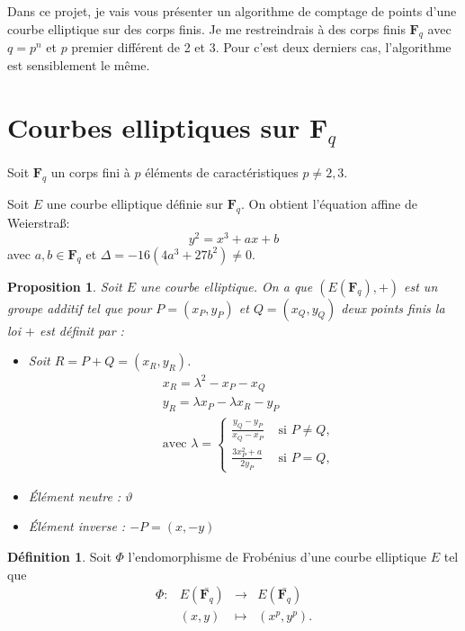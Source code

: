 \documentclass{article}%
\theoremstyle{plain}
\theoremstyle{definition}
\newtheorem{definition}{Définition}[section]
\theoremstyle{plain}
\newtheorem{proposition}{Proposition}[section]
\theoremstyle{plain}
\theoremstyle{remark}
\newcommand\fq{\mathbf{F}_{q}}
\begin{document}
Dans ce projet, je vais vous présenter un algorithme de comptage de points d'une courbe elliptique sur des corps finis. Je me restreindrais à des corps finis $\fq$ avec $q=p^{n}$ et $p$ premier différent de 2 et 3. Pour c'est deux derniers cas, l'algorithme est sensiblement le même. 

\section{Courbes elliptiques sur $\fq$}

Soit $\fq$ un corps fini à $p$ éléments de caractéristiques $p\neq 2,3$.

Soit $E$ une courbe elliptique définie sur $\fq$. On obtient l'équation affine de Weierstra\ss : 
\begin{equation}
y^{2} = x^{3} + ax + b
\label{ecc}
\end{equation} 
avec $a,b\in\fq$ et $\Delta = -16(4a^{3} + 27b^{2}) \neq 0$.

\begin{proposition}
Soit $E$ une courbe elliptique. On a que $(E(\fq), +)$ est un groupe additif tel que pour $P=(x_{P}, y_{P})$ et $Q=(x_{Q}, y_{Q})$ deux points finis la loi $+$ est définit par :
\begin{itemize}
\item Soit $R = P+Q = (x_{R}, y_{R})$.
\begin{align*}
    &x_{R} = \lambda^{2} - x_{P} - x_{Q}\\
    &y_{R} = \lambda x_{P} - \lambda x_{R} - y_{P}\\
    & \text{avec }\lambda = \begin{cases}
      \frac{y_{Q} - y_{P}}{x_{Q} - x_{P}} &\text{ si } P\neq Q,\\
      \frac{3x_{P}^{2} + a}{2y_{P}} &\text{ si } P=Q,
    \end{cases}
\end{align*}
\item Élément neutre : $\vartheta$
\item Élément inverse : $-P = (x,-y)$
\end{itemize}
\end{proposition}

\begin{definition}
Soit $\varPhi$ l'endomorphisme de Frobénius d'une courbe elliptique $E$ tel que  
$$\begin{array}{clcl}
\varPhi : &E(\bar{\fq}) &\longrightarrow &E(\bar{\fq})\\
&(x, y) &\longmapsto	&(x^{p}, y^{p}).\\
\end{array}$$
\end{definition}
\end{document}
